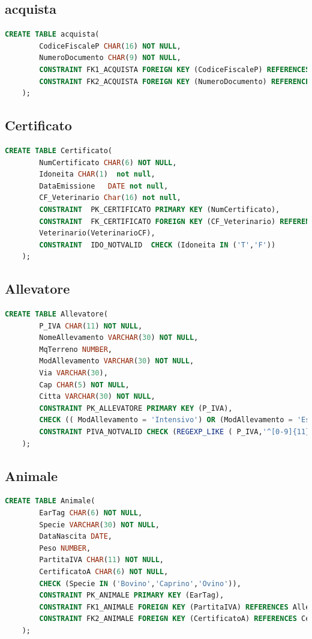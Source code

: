 \documentclass[12pt]{report}
\begin{document}
\subsection*{acquista}\begin{lstlisting}[language=SQL]
    CREATE TABLE acquista(
        CodiceFiscaleP CHAR(16) NOT NULL,
        NumeroDocumento CHAR(9) NOT NULL, 
        CONSTRAINT FK1_ACQUISTA FOREIGN KEY (CodiceFiscaleP) REFERENCES Persona(CF),
        CONSTRAINT FK2_ACQUISTA FOREIGN KEY (NumeroDocumento) REFERENCES Carrello(Doc_N)
    );
\end{lstlisting}

\subsection*{Certificato}\begin{lstlisting}[language=SQL]
    CREATE TABLE Certificato(
        NumCertificato CHAR(6) NOT NULL,
        Idoneita CHAR(1)  not null,
        DataEmissione   DATE not null,
        CF_Veterinario Char(16) not null,
        CONSTRAINT  PK_CERTIFICATO PRIMARY KEY (NumCertificato),
        CONSTRAINT  FK_CERTIFICATO FOREIGN KEY (CF_Veterinario) REFERENCES
        Veterinario(VeterinarioCF),
        CONSTRAINT  IDO_NOTVALID  CHECK (Idoneita IN ('T','F'))
    );
\end{lstlisting}

\subsection*{Allevatore}\begin{lstlisting}[language=SQL]
    CREATE TABLE Allevatore(
        P_IVA CHAR(11) NOT NULL,
        NomeAllevamento VARCHAR(30) NOT NULL,
        MqTerreno NUMBER,
        ModAllevamento VARCHAR(30) NOT NULL,
        Via VARCHAR(30),
        Cap CHAR(5) NOT NULL,
        Citta VARCHAR(30) NOT NULL,
        CONSTRAINT PK_ALLEVATORE PRIMARY KEY (P_IVA),
        CHECK (( ModAllevamento = 'Intensivo') OR (ModAllevamento = 'Estensivo')),
        CONSTRAINT PIVA_NOTVALID CHECK (REGEXP_LIKE ( P_IVA,'^[0-9]{11}'))
    );
\end{lstlisting}

\subsection*{Animale}\begin{lstlisting}[language=SQL]
	CREATE TABLE Animale(
        EarTag CHAR(6) NOT NULL,
        Specie VARCHAR(30) NOT NULL,
        DataNascita DATE,
        Peso NUMBER,
        PartitaIVA CHAR(11) NOT NULL,
        CertificatoA CHAR(6) NOT NULL,
        CHECK (Specie IN ('Bovino','Caprino','Ovino')),
        CONSTRAINT PK_ANIMALE PRIMARY KEY (EarTag),
        CONSTRAINT FK1_ANIMALE FOREIGN KEY (PartitaIVA) REFERENCES Allevatore(P_IVA),
        CONSTRAINT FK2_ANIMALE FOREIGN KEY (CertificatoA) REFERENCES Certificato(NumCertificato)
    );
\end{lstlisting}
\end{document}

